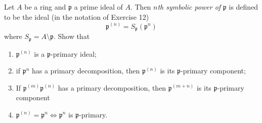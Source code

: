 \begin{exercise}
	Let $A$ be a ring and $\mathfrak{p}$ a prime ideal of $A$. Then \textit{$n$th symbolic power of} $\mathfrak{p}$ is defined to be the ideal (in the notation of Exercise 12)
	\[
		\mathfrak{p}^{(n)} = S_\mathfrak{p}(\mathfrak{p}^n)
	\]
	where $S_\mathfrak{p} = A \setminus \mathfrak{p}$. Show that
	\begin{enumerate}
		\item $\mathfrak{p}^{(n)}$ is a $\mathfrak{p}$-primary ideal;
		\item if $\mathfrak{p}^n$ has a primary decomposition, then $\mathfrak{p}^{(n)}$ is its $\mathfrak{p}$-primary component;
		\item If $\mathfrak{p}^{(m)}\mathfrak{p}^{(n)}$ has a primary decomposition, then $\mathfrak{p}^{(m+n)}$ is its $\mathfrak{p}$-primary component
		\item $\mathfrak{p}^{(n)} = \mathfrak{p}^n \iff \mathfrak{p}^{n}$ is $\mathfrak{p}$-primary.
	\end{enumerate}
\end{exercise}
